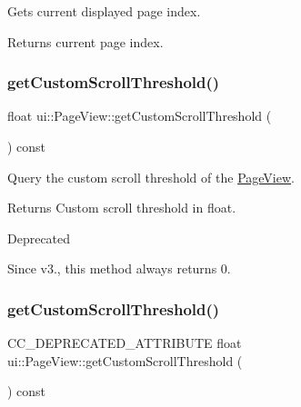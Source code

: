 Gets current displayed page index. \begin{DoxyReturn}{Returns}
current page index. 
\end{DoxyReturn}
\mbox{\label{classui_1_1PageView_a36048cfcf389a27b898960c9596ad8bf}} 
\subsubsection{\texorpdfstring{get\+Custom\+Scroll\+Threshold()}{getCustomScrollThreshold()}\hspace{0.1cm}{\footnotesize\ttfamily [1/2]}}
{\footnotesize\ttfamily float ui\+::\+Page\+View\+::get\+Custom\+Scroll\+Threshold (\begin{DoxyParamCaption}{ }\end{DoxyParamCaption}) const}



Query the custom scroll threshold of the \hyperlink{classui_1_1PageView}{Page\+View}. 

\begin{DoxyReturn}{Returns}
Custom scroll threshold in float. 
\end{DoxyReturn}
\begin{DoxyRefDesc}{Deprecated}
\item[\hyperlink{deprecated__deprecated000152}{Deprecated}]Since v3., this method always returns 0. \end{DoxyRefDesc}
\mbox{\label{classui_1_1PageView_a85a4d633a04862d0a2f4522beae37ae3}} 
\subsubsection{\texorpdfstring{get\+Custom\+Scroll\+Threshold()}{getCustomScrollThreshold()}\hspace{0.1cm}{\footnotesize\ttfamily [2/2]}}
{\footnotesize\ttfamily C\+C\+\_\+\+D\+E\+P\+R\+E\+C\+A\+T\+E\+D\+\_\+\+A\+T\+T\+R\+I\+B\+U\+TE float ui\+::\+Page\+View\+::get\+Custom\+Scroll\+Threshold (\begin{DoxyParamCaption}{ }\end{DoxyParamCaption}) const}



